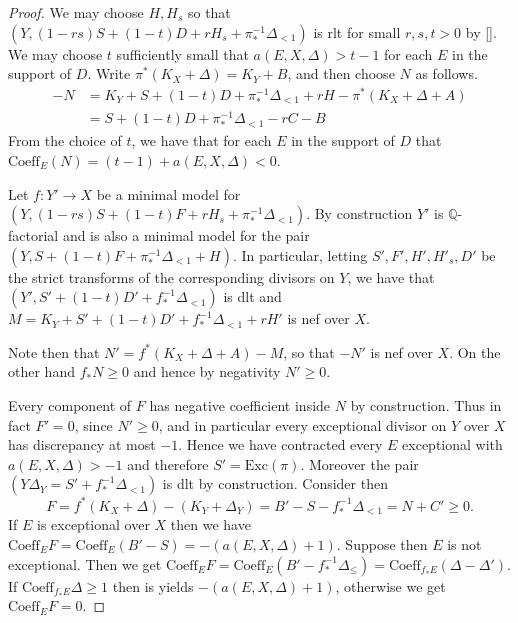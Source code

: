 \documentclass[a4paper,12pt]{book}
\begin{document}
\begin{proof}
	We may choose $H,H_{s}$ so that $(Y, (1-rs)S+(1-t)D+rH_{s}+\pi_{*}^{-1}\Delta_{<1})$ is rlt for small $r,s,t > 0$ by \autoref{}. We may choose $t$ sufficiently small that $a(E,X,\Delta) > t-1$ for each $E$ in the support of $D$. Write $\pi^{*}(K_{X}+\Delta)=K_{Y}+B$, and then choose $N$ as follows.
	\begin{align*}
	-N&=K_{Y}+S+(1-t)D+\pi_{*}^{-1}\Delta_{<1}+rH-\pi^{*}(K_{X}+\Delta+A)\\
	&=S+(1-t)D+\pi_{*}^{-1}\Delta_{<1}-rC-B
	\end{align*}
	From the choice of $t$, we have that for each $E$ in the support of $D$ that $\text{Coeff}_{E}(N)=(t-1)+a(E,X,\Delta) < 0$.
	
	Let $f:Y' \to X$ be a minimal model for $(Y, (1-rs)S+(1-t)F+rH_{s}+\pi_{*}^{-1}\Delta_{<1})$. By construction $Y'$ is $\mathbb{Q}$-factorial and is also a minimal model for the pair $(Y,S+(1-t)F+\pi_{*}^{-1}\Delta_{<1}+H)$. In particular, letting $S',F',H', H'_{s},D'$ be the strict transforms of the corresponding divisors on $Y$, we have that $(Y',S'+(1-t)D'+f_{*}^{-1}\Delta_{<1})$ is dlt and $M=K_{Y}+S'+(1-t)D'+f_{*}^{-1}\Delta_{<1}+rH'$ is nef over $X$.
	
	Note then that $N'=f^{*}(K_{X}+\Delta+A)-M$, so that $-N'$ is nef over $X$. On the other hand $f_{*}N \geq 0$ and hence by negativity $N' \geq 0$. 
	
 	Every component of $F$ has negative coefficient inside $N$ by construction. Thus in fact $F'=0$, since $N' \geq 0$, and in particular every exceptional divisor on $Y$ over $X$ has discrepancy at most $-1$. Hence we have contracted every $E$ exceptional with $a(E,X,\Delta) >-1$ and therefore $S'=\text{Exc}(\pi)$. Moreover the pair $(Y\Delta_{Y}=S'+f_{*}^{-1}\Delta_{<1})$ is dlt by construction. Consider then $$F=f^{*}(K_{X}+\Delta)-(K_{Y}+\Delta_{Y})=B'-S-f_{*}^{-1}\Delta_{<1}=N+C' \geq 0.$$ If $E$ is exceptional over $X$ then we have $\text{Coeff}_{E}F=\text{Coeff}_{E}(B'-S)=-(a(E,X,\Delta)+1)$. Suppose then $E$ is not exceptional. Then we get $\text{Coeff}_{E}F=\text{Coeff}_{E}(B'-f_{*}^{-1}\Delta_{\leq})=\text{Coeff}_{f_{*}E}(\Delta-\Delta')$. If $\text{Coeff}_{f_{*}E}\Delta \geq 1$ then is yields $-(a(E,X,\Delta)+1)$, otherwise we get $\text{Coeff}_{E}F=0$.
 	
%
% 	
	

\end{proof}
\end{document}
